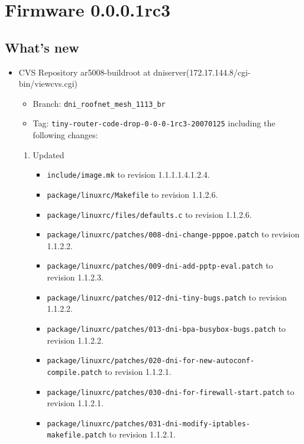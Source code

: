 \documentclass[12pt]{report}
\newcommand{\tlabel}[1]{
  \label{#1}%
  }
\begin{document}

\section{Firmware 0.0.0.1rc3}
\tlabel{sec:0.0.0.1rc3}

\subsection{What's new}
\begin{itemize}
\item CVS Repository ar5008-buildroot at dniserver(172.17.144.8/cgi-bin/viewcvs.cgi) 
\begin{itemize}
    \item Branch: \texttt{dni\_roofnet\_mesh\_1113\_br}
    \item Tag: \texttt{tiny-router-code-drop-0-0-0-1rc3-20070125} including the following changes:
\end{itemize}
\begin{enumerate}
\item Updated
\begin{itemize}
  \item \texttt{include/image.mk} to revision 1.1.1.1.4.1.2.4.
  \item \texttt{package/linuxrc/Makefile} to revision 1.1.2.6.
  \item \texttt{package/linuxrc/files/defaults.c} to revision 1.1.2.6.
  \item \texttt{package/linuxrc/patches/008-dni-change-pppoe.patch} to revision 1.1.2.2.
  \item \texttt{package/linuxrc/patches/009-dni-add-pptp-eval.patch} to revision 1.1.2.3.
  \item \texttt{package/linuxrc/patches/012-dni-tiny-bugs.patch} to revision 1.1.2.2.
  \item \texttt{package/linuxrc/patches/013-dni-bpa-busybox-bugs.patch} to revision 1.1.2.2.
  \item \texttt{package/linuxrc/patches/020-dni-for-new-autoconf-compile.patch} to revision 1.1.2.1.
  \item \texttt{package/linuxrc/patches/030-dni-for-firewall-start.patch} to revision 1.1.2.1.
  \item \texttt{package/linuxrc/patches/031-dni-modify-iptables-makefile.patch} to revision 1.1.2.1.

\end{itemize}
\end{enumerate}
\end{itemize}
\end{document}
